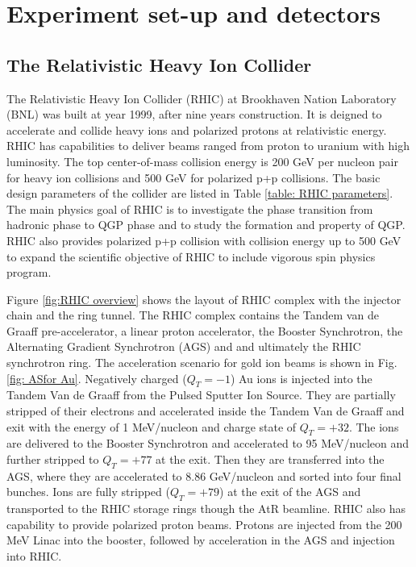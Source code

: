 %

\chapter{Experiment set-up and detectors}


\section{The Relativistic Heavy Ion Collider}

The Relativistic Heavy Ion Collider (RHIC) at Brookhaven Nation Laboratory
(BNL) was built at year 1999, after nine years construction. It is
deigned to accelerate and collide heavy ions and polarized protons
at relativistic energy. RHIC has capabilities to deliver beams ranged
from proton to uranium with high luminosity. The top center-of-mass
collision energy is 200 GeV per nucleon pair for heavy ion collisions
and 500 GeV for polarized p+p collisions. The basic design parameters
of the collider are listed in Table \ref{table: RHIC parameters}.
The main physics goal of RHIC is to investigate the phase transition
from hadronic phase to QGP phase and to study the formation and property
of QGP. RHIC also provides polarized p+p collision with collision
energy up to 500 GeV to expand the scientific objective of RHIC to
include vigorous spin physics program.

Figure \ref{fig:RHIC overview} shows the layout of RHIC complex with
the injector chain and the ring tunnel. The RHIC complex contains
the Tandem van de Graaff pre-accelerator, a linear proton accelerator,
the Booster Synchrotron, the Alternating Gradient Synchrotron (AGS)
and and ultimately the RHIC synchrotron ring. The acceleration scenario
for gold ion beams is shown in Fig. \ref{fig: ASfor Au}. Negatively
charged ($Q_{T}=-1$) Au ions is injected into the Tandem Van de Graaff
from the Pulsed Sputter Ion Source. They are partially stripped of
their electrons and accelerated inside the Tandem Van de Graaff and
exit with the energy of 1 MeV/nucleon and charge state of $Q_{T}=+32$.
The ions are delivered to the Booster Synchrotron and accelerated
to 95 MeV/nucleon and further stripped to $Q_{T}=+77$ at the exit.
Then they are transferred into the AGS, where they are accelerated
to 8.86 GeV/nucleon and sorted into four final bunches. Ions are fully
stripped ($Q_{T}=+79$) at the exit of the AGS and transported to
the RHIC storage rings though the AtR beamline. RHIC also has capability
to provide polarized proton beams. Protons are injected from the 200
MeV Linac into the booster, followed by acceleration in the AGS and
injection into RHIC.

